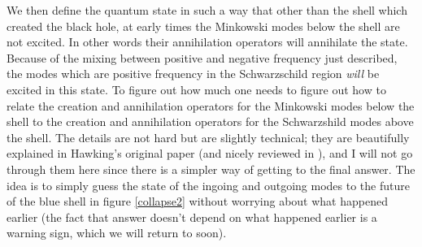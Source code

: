 \documentclass[12pt]{article}
\begin{document}
We then define the quantum state in such a way that other than the shell which created the black hole, at early times the Minkowski modes below the shell are not excited.  In other words their annihilation operators will annihilate the state.  Because of the mixing between positive and negative frequency just described, the modes which are positive frequency in the Schwarzschild region \textit{will} be excited in this state.  To figure out how much one needs to figure out how to relate the creation and annihilation operators for the Minkowski modes below the shell to the creation and annihilation operators for the Schwarzshild modes above the shell.  The details are not hard but are slightly technical; they are beautifully explained in Hawking's original paper \cite{Hawking:1974sw} (and nicely reviewed in \cite{Wald:1984rg}), and I will not go through them here since there is a simpler way of getting to the final answer.  The idea is to simply guess the state of the ingoing and outgoing modes to the future of the blue shell in figure \ref{collapse2} without worrying about what happened earlier (the fact that answer doesn't depend on what happened earlier is a warning sign, which we will return to soon).  
\end{document}
